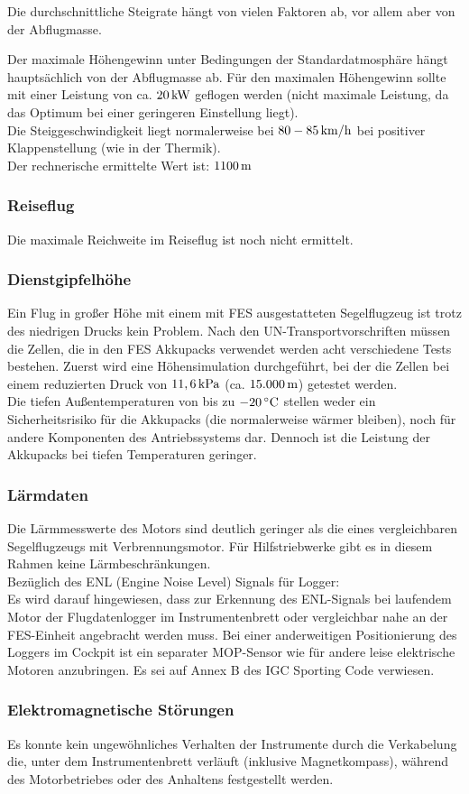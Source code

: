 Die durchschnittliche Steigrate hängt von vielen Faktoren ab, vor allem aber von der Abflugmasse.

Der maximale Höhengewinn unter Bedingungen der Standardatmosphäre hängt hauptsächlich von der Abflugmasse ab. Für den maximalen Höhengewinn sollte mit einer Leistung von ca. $\unit[20]{kW}$ geflogen werden (nicht maximale Leistung, da das Optimum bei einer geringeren Einstellung liegt).\\ 
Die Steiggeschwindigkeit liegt normalerweise bei $\unit[80-85]{km/h}$ bei positiver Klappenstellung (wie in der Thermik).\\
Der rechnerische ermittelte Wert ist: $\unit[1100]{m}$ 

\subsubsection{Reiseflug}
Die maximale Reichweite im Reiseflug ist noch nicht ermittelt. 

\subsubsection{Dienstgipfelhöhe}
Ein Flug in großer Höhe mit einem mit FES ausgestatteten Segelflugzeug ist trotz des niedrigen Drucks kein Problem. Nach den UN-Transportvorschriften müssen die Zellen, die in den FES Akkupacks verwendet werden acht verschiedene Tests bestehen. Zuerst wird eine Höhensimulation durchgeführt, bei der die Zellen bei einem reduzierten Druck von $\unit[11,6]{kPa}$ (ca. $\unit[15.000]{m}$) getestet werden.\\

Die tiefen Außentemperaturen von bis zu $\unit[-20]{^\circ C}$ stellen weder ein Sicherheitsrisiko für
die Akkupacks (die normalerweise wärmer bleiben), noch für andere Komponenten des Antriebssystems dar. Dennoch ist die Leistung der Akkupacks bei tiefen Temperaturen geringer.

\subsubsection{Lärmdaten} 
Die Lärmmesswerte des Motors sind deutlich geringer als die eines vergleichbaren Segelflugzeugs mit Verbrennungsmotor.
Für Hilfstriebwerke gibt es in diesem Rahmen keine Lärmbeschränkungen.\\

Bezüglich des ENL (Engine Noise Level) Signals für Logger:\\
Es wird darauf hingewiesen, dass zur Erkennung des ENL-Signals bei laufendem Motor der Flugdatenlogger im Instrumentenbrett oder vergleichbar nahe an der FES-Einheit angebracht werden muss. Bei einer anderweitigen Positionierung des Loggers im
Cockpit ist ein separater MOP-Sensor wie für andere leise elektrische Motoren anzubringen.
Es sei auf Annex B des IGC Sporting Code verwiesen.

\subsubsection{Elektromagnetische Störungen}
Es konnte kein ungewöhnliches Verhalten der Instrumente durch die Verkabelung die, unter dem Instrumentenbrett verläuft (inklusive Magnetkompass), während des Motorbetriebes oder des Anhaltens festgestellt werden.



